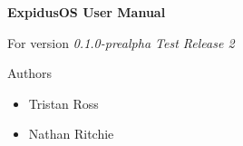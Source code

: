 \begin{titlepage}
	\begin{center}
		\vspace*{5cm}
		\huge\textbf{ExpidusOS User Manual}\normalsize

		\vspace{0.5cm}
		For version \textit{0.1.0-prealpha Test Release 2}

		\vspace{5cm}
		\large
		Authors
		\normalsize
		\begin{itemize}
			\item Tristan Ross
			\item Nathan Ritchie
		\end{itemize}
	\end{center}
\end{titlepage}
